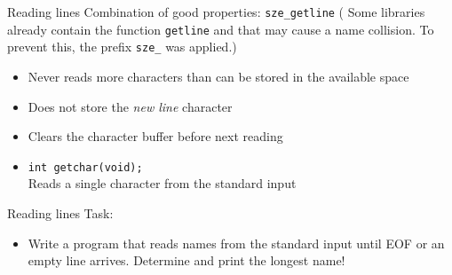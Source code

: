 \documentclass[usenames,dvipsnames,aspectratio=169]{beamer}
\begin{document}
\begin{frame}{Reading lines}
  \footnotesize
  Combination of good properties: \texttt{sze\_getline} ( Some libraries already contain the function \texttt{getline} and that may cause a name collision. To prevent this, the prefix \texttt{sze\_} was applied.)
  \begin{itemize}
    \scriptsize
    \item Never reads more characters than can be stored in the available space
    \item Does not store the \emph{new line} character
    \item Clears the character buffer before next reading
  \end{itemize}
  \begin{exampleblock}{}
    \scriptsize
    
    
  \end{exampleblock}
  \begin{itemize}
    \item \texttt{int getchar(void);} \\
      Reads a single character from the standard input
  \end{itemize}
\end{frame}

\begin{frame}{Reading lines}
  \scriptsize
  Task:
  \begin{itemize}
    \item[] Write a program that reads names from the standard input until EOF or an empty line arrives.
Determine and print the longest name!
  \end{itemize}
  \begin{exampleblock}{}
    \fontsize{8}{9} \selectfont
    
  \end{exampleblock}
\end{frame}
\end{document}
